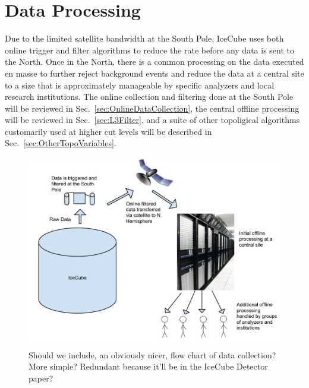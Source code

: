 \documentclass[../Main.tex]{subfiles}
\begin{document}
       {}       {}
    {}    {}
 {} {}


\graphicspath{{figures/}{DataProcessing/figures/}}


\section{Data Processing}\label{sec:DataProcessing}

Due to the limited satellite bandwidth at the South Pole, IceCube uses
both online trigger and filter algorithms to reduce the rate
before any data is sent to the North. Once in the North, there is a
common processing on the data executed en masse to further reject background
events and reduce the data at a central site to a size that is approximately
manageable by specific analyzers and local research institutions. The
online collection and filtering done at the South Pole will be
reviewed in Sec.~\ref{sec:OnlineDataCollection}, the central offline
processing will be reviewed in Sec.~\ref{sec:L3Filter}, and a suite of
other topoligical algorithms customarily used at higher cut levels
will be described in Sec.~\ref{sec:OtherTopoVariables}.

\begin{figure}[bth!]
\centering
\includegraphics[scale=0.4]{Online_IceCube_data_processing_flow_chart.pdf}
\caption{\label{fig:DataFlowChart} Should we include, an obviously
  nicer, flow chart of data collection? More simple? Redundant because
it'll be in the IceCube Detector paper?}
\end{figure}
\end{document}
